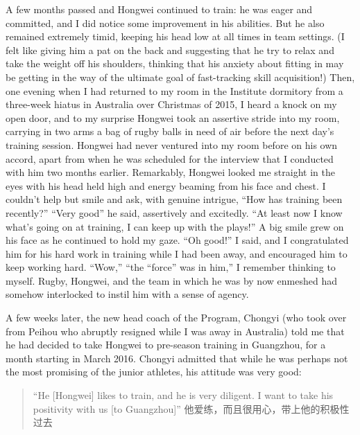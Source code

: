 A few months passed and Hongwei continued to train: he was eager and committed, and I did notice some improvement in his abilities. But he also remained extremely timid, keeping his head low at all times in team settings.  (I felt like giving him a pat on the back and suggesting that he try to relax and take the weight off his shoulders, thinking that his anxiety about fitting in may be getting in the way of the ultimate goal of fast-tracking skill acquisition!)  Then, one evening when I had returned to my room in the Institute dormitory from a three-week hiatus in Australia over Christmas of 2015, I heard a knock on my open door, and to my surprise Hongwei took an assertive stride into my room, carrying in two arms a bag of rugby balls in need of air before the next day's training session.  Hongwei had never ventured into my room before on his own accord, apart from when he was scheduled for the interview that I conducted with him two months earlier.  Remarkably, Hongwei looked me straight in the eyes with his head held high and energy beaming from his face and chest.  I couldn’t help but smile and ask, with genuine intrigue, ``How has training been recently?''
``Very good'' he said, assertively and excitedly.  ``At least now I know what’s going on at training, I can keep up with the plays!''  A big smile grew on his face as he continued to hold my gaze.  ``Oh good!'' I said, and I congratulated him for his hard work in training while I had been away, and encouraged him to keep working hard. ``Wow,'' ``the ``force'' was in him,'' I remember thinking to myself.  Rugby, Hongwei, and the team in which he was by now enmeshed had somehow interlocked to instil him with a sense of agency.


A few weeks later, the new head coach of the Program, Chongyi (who took over from Peihou who abruptly resigned while I was away in Australia) told me that he had decided to take Hongwei to pre-season training in Guangzhou, for a month starting in March 2016.  Chongyi admitted that while he was perhaps not the most promising of the junior athletes, his attitude was very good:

\begin{CJK}{UTF8}{gbsn}
  \begin{quotation}
``He [Hongwei] likes to train, and he is very diligent. I want to take his positivity with us [to Guangzhou]'' 他爱练，而且很用心，带上他的积极性过去
  \end{quotation}
\end{CJK}

